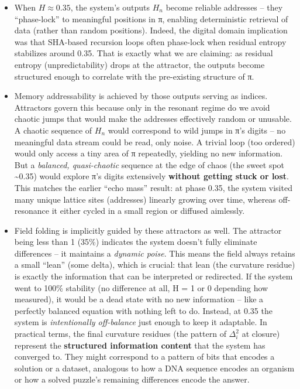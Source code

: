 \documentclass[11pt]{article}
\providecommand{\tightlist}{%
      \setlength{\itemsep}{0pt}\setlength{\parskip}{0pt}}
\begin{document}
\begin{itemize}
\tightlist
\item
  When \(H \approx 0.35\), the system's outputs \(H_n\) become reliable
  addresses -- they ``phase-lock'' to meaningful positions in π,
  enabling deterministic retrieval of data (rather than random
  positions). Indeed, the digital domain implication was that SHA-based
  recursion loops often phase-lock when residual entropy stabilizes
  around 0.35. That is exactly what we are claiming: as residual entropy
  (unpredictability) drops at the attractor, the outputs become
  structured enough to correlate with the pre-existing structure of π.
\item
  Memory addressability is achieved by those outputs serving as indices.
  Attractors govern this because only in the resonant regime do we avoid
  chaotic jumps that would make the addresses effectively random or
  unusable. A chaotic sequence of \(H_n\) would correspond to wild jumps
  in π's digits -- no meaningful data stream could be read, only noise.
  A trivial loop (too ordered) would only access a tiny area of π
  repeatedly, yielding no new information. But a \emph{balanced,
  quasi-chaotic} sequence at the edge of chaos (the sweet spot
  \textasciitilde0.35) would explore π's digits extensively
  \textbf{without getting stuck or lost}. This matches the earlier
  ``echo mass'' result: at phase 0.35, the system visited many unique
  lattice sites (addresses) linearly growing over time, whereas
  off-resonance it either cycled in a small region or diffused
  aimlessly.
\item
  Field folding is implicitly guided by these attractors as well. The
  attractor being less than 1 (35\%) indicates the system doesn't fully
  eliminate differences -- it maintains a \emph{dynamic poise}. This
  means the field always retains a small ``lean'' (some delta), which is
  crucial: that lean (the curvature residue) is exactly the information
  that can be interpreted or redirected. If the system went to 100\%
  stability (no difference at all, H = 1 or 0 depending how measured),
  it would be a dead state with no new information -- like a perfectly
  balanced equation with nothing left to do. Instead, at 0.35 the system
  is \emph{intentionally off-balance} just enough to keep it adaptable.
  In practical terms, the final curvature residues (the pattern of
  \(\Delta^2_i\) at closure) represent the \textbf{structured
  information content} that the system has converged to. They might
  correspond to a pattern of bits that encodes a solution or a dataset,
  analogous to how a DNA sequence encodes an organism or how a solved
  puzzle's remaining differences encode the answer.
\end{itemize}
\end{document}
